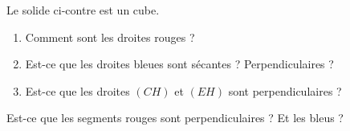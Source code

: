 
\begin{exercice}\label{exoSeconde-0087}

    \begin{multicols}{2}
            Le solide ci-contre est un cube. 
        \begin{enumerate}
            \item
        Comment sont les droites rouges ?
    \item
        Est-ce que les droites bleues sont sécantes ? Perpendiculaires ?
    \item
        Est-ce que les droites \( (CH)\) et \( (EH)\) sont perpendiculaires ?
        \end{enumerate}

    Est-ce que les segments rouges sont perpendiculaires ? Et les bleus ?

\columnbreak

\begin{center}

\end{center}

    \end{multicols}

\end{exercice}
